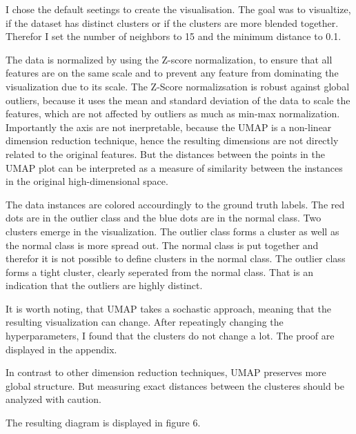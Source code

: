 I chose the default seetings to create the visualisation. 
The goal was to visualtize, if the dataset has distinct clusters or if the clusters are more blended together.
Therefor I set the number of neighbors to 15 and the minimum distance to 0.1.


The data is normalized by using the Z-score normalization, to ensure that all features are on the same scale and to prevent any feature from dominating the visualization due to its scale.
The Z-Score normalizsation is robust against global outliers, because it uses the mean and standard deviation of the data to scale the features, which are not affected by outliers as much as min-max normalization.
Importantly the axis are not inerpretable, because the UMAP is a non-linear dimension reduction technique, hence the resulting dimensions are not directly related to the original features.
But the distances between the points in the UMAP plot can be interpreted as a measure of similarity between the instances in the original high-dimensional space.


The data instances are colored accourdingly to the ground truth labels.
The red dots are in the outlier class and the blue dots are in the normal class.
Two clusters emerge in the visualization.
The outlier class forms a cluster as well as the normal class is more spread out.
The normal class is put together and therefor it is not possible to define clusters in the normal class.
The outlier class forms a tight cluster, clearly seperated from the normal class.
That is an indication that the outliers are highly distinct.

It is worth noting, that UMAP takes a sochastic approach, meaning that the resulting visualization can change.
After repeatingly changing the hyperparameters, I found that the clusters do not change a lot.
The proof are displayed in the appendix.


In contrast to other dimension reduction techniques, UMAP preserves more global structure.
But measuring exact distances between the clusteres should be analyzed with caution. 


The resulting diagram is displayed in figure 6.

